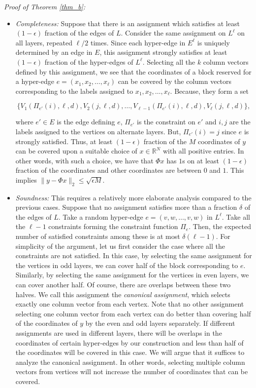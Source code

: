 \documentclass[11pt]{article}
\begin{document}
\emph{Proof of Theorem \ref{thm_b}:}
\begin{itemize}
\item \textit{Completeness:} Suppose that there is an assignment
which satisfies at least $(1-\epsilon)$ fraction of the edges of $L$.
Consider the same assignment on $L^{\ell}$ on all layers, repeated
$\ell/2$ times. Since each hyper-edge in $E^{\ell}$ is uniquely
determined by an edge in $E$, this assignment strongly satisfies
at least $(1-\epsilon)$ fraction of the hyper-edges of $L^{\ell}$.
Selecting all the $k$ column vectors
defined by this assignment, we see that the coordinates of a block
reserved for a hyper-edge  $e=(x_1,x_2,\hdots,x_{\ell})$ can be
covered by the column vectors corresponding to the labels assigned
to $x_1,x_2,\hdots,x_{\ell}$. Because, they form a set

$$
\{V_1(\Pi_{e'}(i),\ell,d), V_2(j,\ell,d), \hdots, V_{\ell-1}(\Pi_{e'}(i),
\ell,d), V_{\ell}(j,\ell,d)\},
$$

\noindent where $e' \in E$ is the edge
defining $e$, $\Pi_{e'}$ is the constraint on $e'$ and $i,j$ are
the labels assigned to the vertices on alternate layers. But,
$\Pi_{e'}(i)=j$ since $e$ is strongly satisfied. Thus, at least
$(1-\epsilon)$ fraction of the $M$ coordinates of $y$ can be covered
upon a suitable choice of $x \in \mathbb{R}^N$ with all positive entries.
In other words, with such a choice, we have that $\Phi x$ has $1$s on
at least $(1-\epsilon)$ fraction of the coordinates and other coordinates
are between $0$ and $1$. This implies $\|y - \Phi x\|_2 \leq \sqrt{\epsilon M}$.

\item \textit{Soundness:} This requires a relatively more elaborate
analysis compared to the previous cases. Suppose that no assignment
satisfies more than a fraction $\delta$ of the edges of $L$. Take
a random hyper-edge $e=(v,w,\hdots,v,w)$ in $L^{\ell}$. Take all the
$\ell-1$ constraints forming the constraint function $\Pi_e$. Then,
the expected number of satisfied constraints among these is at most
$\delta(\ell-1)$. For simplicity of the argument, let us first
consider the case where all the constraints are not satisfied. In
this case, by selecting the same assignment for the vertices in odd
layers, we can cover half of the block corresponding to $e$.
Similarly, by selecting the same assignment for the vertices in
even layers, we can cover another half. Of course, there are overlaps
between these two halves. We call this assignment the
\emph{canonical assignment}, which selects exactly one column vector
from each vertex. Note that no other assignment selecting one column
vector from each vertex can do better than covering half of the
coordinates of $y$ by the even and odd layers separately. If
different assignments are used in different layers, there will be overlaps
in the coordinates of certain hyper-edges by our construction and
less than half of the coordinates will be covered in this case. We will argue
that it suffices to analyze the canonical assignment. In other words,
selecting multiple column vectors from vertices will not increase
the number of coordinates that can be covered.


\end{itemize}
\end{document}
